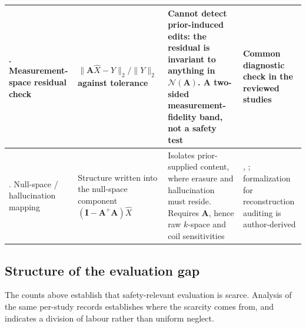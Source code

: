 \documentclass[review,authoryear]{elsarticle}
\begin{document}
\begin{table}[htbp]
\begin{tabular}{>{\raggedright\arraybackslash}p{} >{\raggedright\arraybackslash}p{} >{\raggedright\arraybackslash}p{} >{\raggedright\arraybackslash}p{}}
\hline
5. Measurement-space residual check & $\|\mathbf{A}\hat{X} - Y\|_2 / \|Y\|_2$ against tolerance & \textbf{Cannot detect prior-induced edits}: the residual is invariant to anything in $\mathcal{N}(\mathbf{A})$. A two-sided measurement-fidelity band, not a safety test & Common diagnostic check in the reviewed studies \\
\hline
6. Null-space / hallucination mapping & Structure written into the null-space component $(\mathbf{I}-\mathbf{A}^{+}\mathbf{A})\hat{X}$ & Isolates prior-supplied content, where erasure and hallucination must reside. Requires $\mathbf{A}$, hence raw $k$-space and coil sensitivities & \citet{bhadra2021hallucinations}, \citet{gottschling2020troublesome}; formalization for reconstruction auditing is author-derived \\
\hline
\end{tabular}
\end{table}


\subsection{Structure of the evaluation gap}
\label{res:gap_structure}
The counts above establish that safety-relevant evaluation is scarce. Analysis of the
same per-study records establishes where the scarcity comes from, and indicates a
division of labour rather than uniform neglect.
\end{document}
